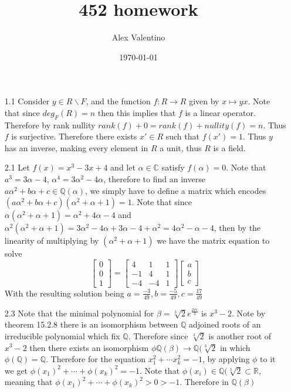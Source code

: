 \documentclass[12pt, letterpaper]{article}
\date{\today}
\author{Alex Valentino}
\title{452 homework}
\newcommand{\R}{\mathbb{R}}
\newcommand{\Q}{\mathbb{Q}}
\newcommand{\C}{\mathbb{C}}
\begin{document}
\begin{enumerate}
	\item[1.1] Consider $y \in R \backslash F$, and the function 
	$f:R \to R$ given by $x \mapsto yx$.  Note that since $deg_F(R) = n$ then 
	this implies that $f$ is a linear operator.  Therefore by rank nullity 
	$rank(f) + 0 = rank(f) + nullity(f) = n$.  Thus $f$ is surjective.  Therefore 
	there exists $x' \in R$ such that $f(x') = 1$.  Thus $y$ has an inverse, making 
	every element in $R$ a unit, thus $R$ is a field.  
	\item[2.1] Let $f(x) = x^3 -3x+4$ and let $\alpha \in \C$ satisfy 
	$f(\alpha) = 0$. Note that $a^3 = 3\alpha - 4$, 
	$\alpha^4 = 3\alpha^2 - 4\alpha$, 	
	therefore to find an inverse  $ a \alpha^2 + b \alpha + c \in \Q(\alpha)$,
	we simply have to define a matrix which encodes 
	$(a\alpha^2 + b\alpha + c)(\alpha^2 + \alpha + 1) = 1$.  Note that since
	$\alpha(\alpha^2 + \alpha + 1) = \alpha^2 + 4 \alpha - 4$ and 
	$\alpha^2 (\alpha^2 + \alpha + 1) = 3 \alpha^2 - 4 \alpha + 3 \alpha - 4 + \alpha^2 = 4 \alpha^2 - \alpha - 4$, then by the linearity of multiplying by 
	$(\alpha^2 + \alpha + 1)$ we have the matrix equation to solve
	$$
	\begin{bmatrix}0 \\ 0 \\ 1\end{bmatrix} = \begin{bmatrix}
	4 & 1 & 1\\ -1 & 4 & 1\\ -4 & -4 & 1
	\end{bmatrix}\begin{bmatrix}a \\ b \\ c\end{bmatrix}
	$$
	With the resulting solution being $a = \frac{-3}{49}, b = \frac{-5}{49},c=\frac{17}{49}$
	\item[2.3] Note that the minimal polynomial for $\beta = \sqrt[3]{2}e^{\frac{2\pi i}{3}}$ is $x^3 - 2$.  Note by theorem 15.2.8 there is an isomorphism
	between $\Q$ adjoined roots of an irreducible polynomial which fix $\Q$.
	Therefore since $\sqrt[3]{2}$ is another root of $x^3 -2 $ then there exists
	an isomorphism $\phi \Q(\beta) \to \Q(\sqrt[3]{2}$ in which $\phi(\Q) = \Q$.
	Therefore for the equation $x_1^2 + \cdots x_k^2 = -1$, by applying $\phi$ 
	to it we get $\phi(x_1)^2 + \cdots + \phi(x_k)^2 = -1$.  Note that 
	$\phi(x_i) \in \Q(\sqrt[3]{2} \subset \R$, meaning that 
	$\phi(x_1)^2 + \cdots + \phi(x_k)^2 > 0 > -1$.  Therefore in $\Q(\beta)$ 

\end{enumerate}
\end{document}
